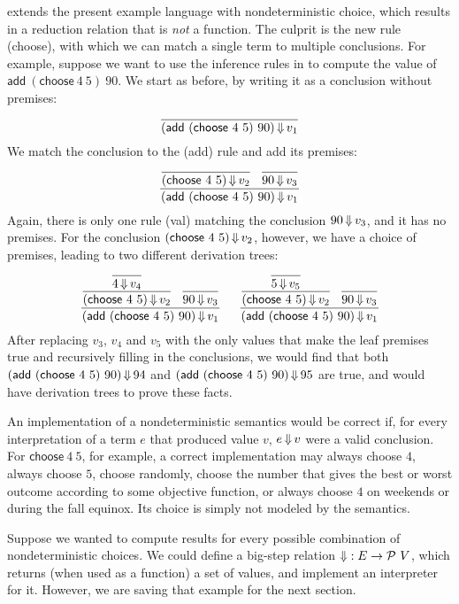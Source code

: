  extends the present example language with nondeterministic choice, which results in a reduction relation that is \emph{not} a function.
The culprit is the new rule (choose), with which we can match a single term to multiple conclusions.
For example, suppose we want to use the inference rules in  to compute the value of $\mathsf{add}~(\mathsf{choose}~4~5)~90$.
We start as before, by writing it as a conclusion without premises:
\begin{equation}
	\dfrac{}{(\mathsf{add}~(\mathsf{choose}~4~5)~90) \operatorname{\Downarrow} v_1}
\end{equation}
We match the conclusion to the (add) rule and add its premises:
\begin{equation}
	\dfrac{
		\dfrac{}{(\mathsf{choose}~4~5) \operatorname{\Downarrow} v_2}
		\;\;\,
		\dfrac{}{90 \operatorname{\Downarrow} v_3}
	}{(\mathsf{add}~(\mathsf{choose}~4~5)~90) \operatorname{\Downarrow} v_1}
\end{equation}
Again, there is only one rule (val) matching the conclusion $90 \operatorname{\Downarrow} v_3$, and it has no premises.
For the conclusion $(\mathsf{choose}~4~5) \operatorname{\Downarrow} v_2$, however, we have a choice of premises, leading to two different derivation trees:
\begin{equation}
	\dfrac{
		\dfrac{
			\dfrac{}{4 \operatorname{\Downarrow} v_4}
		}{(\mathsf{choose}~4~5) \operatorname{\Downarrow} v_2}
		\;\;\,
		\dfrac{}{90 \operatorname{\Downarrow} v_3}
	}{(\mathsf{add}~(\mathsf{choose}~4~5)~90) \operatorname{\Downarrow} v_1}
	\;\;\,
	\;\;\,
	\dfrac{
		\dfrac{
			\dfrac{}{5 \operatorname{\Downarrow} v_5}
		}{(\mathsf{choose}~4~5) \operatorname{\Downarrow} v_2}
		\;\;\,
		\dfrac{}{90 \operatorname{\Downarrow} v_3}
	}{(\mathsf{add}~(\mathsf{choose}~4~5)~90) \operatorname{\Downarrow} v_1}
\end{equation}
After replacing $v_3$, $v_4$ and $v_5$ with the only values that make the leaf premises true and recursively filling in the conclusions, we would find that both $(\mathsf{add}~(\mathsf{choose}~4~5)~90) \operatorname{\Downarrow} 94$ and $(\mathsf{add}~(\mathsf{choose}~4~5)~90) \operatorname{\Downarrow} 95$ are true, and would have derivation trees to prove these facts.

An implementation of a nondeterministic semantics would be correct if, for every interpretation of a term $e$ that produced value $v$, $e \operatorname{\Downarrow} v$ were a valid conclusion.
For $\mathsf{choose}~4~5$, for example, a correct implementation may always choose $4$, always choose $5$, choose randomly, choose the number that gives the best or worst outcome according to some objective function, or always choose $4$ on weekends or during the fall equinox.
Its choice is simply not modeled by the semantics.

Suppose we wanted to compute results for every possible combination of nondeterministic choices.
We could define a big-step relation $\operatorname{\Downarrow} : E \to \mathcal{P}~V$, which returns (when used as a function) a set of values, and implement an interpreter for it.
However, we are saving that example for the next section.


